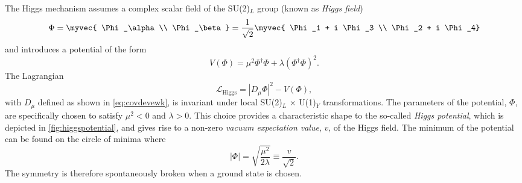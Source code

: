 
The Higgs mechanism assumes a complex scalar field of the SU(2)$_L$ group (known as \emph{Higgs field})
\begin{equation}
  \Phi = \myvec{ \Phi_\alpha \\ \Phi_\beta } = \frac{1}{\sqrt{2}} \myvec { \Phi_1 + i \Phi_3 \\ \Phi_2 + i \Phi_4}
\end{equation}
and introduces a potential of the form
\begin{equation}
  V(\Phi) = \mu^2\Phi^\dagger\Phi + \lambda \left(\Phi^\dagger\Phi \right)^2.
  \label{eq:higgspotential}
\end{equation}
The Lagrangian 
\begin{equation}
  \mathcal{L}_{\text{Higgs}} = |D_\mu\Phi|^2 - V(\Phi), %
  \label{eq:lagrangianhiggs}
\end{equation}
with $D_\mu$ defined as shown in \cref{eq:covdevewk}, is invariant under local SU(2)$_L$ $\times$ U(1)$_Y$ transformations.
The parameters of the potential, $\Phi$, are specifically chosen to satisfy $\mu^2 < 0$ and $\lambda > 0$.
This choice provides a characteristic shape to the so-called \emph{Higgs potential}, which is depicted in \cref{fig:higgspotential}, and gives rise to a non-zero \emph{vacuum expectation value}, $v$, of the Higgs field.
The minimum of the potential can be found on the circle of minima where
\begin{equation}
  |\Phi| = \sqrt{ \frac{\mu^2}{2\lambda} } \equiv \frac{ v }{\sqrt{2}}.
  \label{eq:higgsminima}
\end{equation}
The symmetry is therefore spontaneously broken when a ground state is chosen. 


